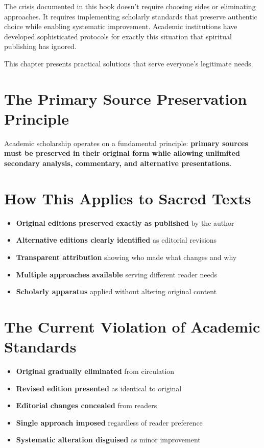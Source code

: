 \documentclass[11pt,twoside]{book}
\begin{document}
\normalfont\justifying
The crisis documented in this book doesn't require choosing sides or eliminating approaches. It requires implementing scholarly standards that preserve authentic choice while enabling systematic improvement. Academic institutions have developed sophisticated protocols for exactly this situation that spiritual publishing has ignored.

This chapter presents practical solutions that serve everyone's legitimate needs.
\section*{The Primary Source Preservation Principle}
\label{sec:org0637974}

Academic scholarship operates on a fundamental principle: \textbf{\textbf{primary sources must be preserved in their original form while allowing unlimited secondary analysis, commentary, and alternative presentations.}}
\section*{How This Applies to Sacred Texts}
\label{sec:orga569d70}
\begin{itemize}
\item \textbf{\textbf{Original editions preserved exactly as published}} by the author
\item \textbf{\textbf{Alternative editions clearly identified}} as editorial revisions
\item \textbf{\textbf{Transparent attribution}} showing who made what changes and why
\item \textbf{\textbf{Multiple approaches available}} serving different reader needs
\item \textbf{\textbf{Scholarly apparatus}} applied without altering original content
\end{itemize}
\section*{The Current Violation of Academic Standards}
\label{sec:orgcaadc82}
\begin{itemize}
\item \textbf{\textbf{Original gradually eliminated}} from circulation
\item \textbf{\textbf{Revised edition presented}} as identical to original
\item \textbf{\textbf{Editorial changes concealed}} from readers
\item \textbf{\textbf{Single approach imposed}} regardless of reader preference
\item \textbf{\textbf{Systematic alteration disguised}} as minor improvement
\end{itemize}
\end{document}
